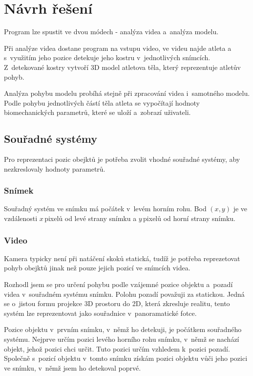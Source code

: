 \chapter{Návrh řešení}

Program lze spustit ve dvou módech - analýza videa a~analýza modelu.

Při analýze videa dostane program na vstupu video, ve videu najde atleta a s~využitím jeho pozice detekuje jeho kostru v~jednotlivých snímcích. Z~detekované kostry vytvoří 3D model atletova těla, který reprezentuje atletův pohyb.

Analýza pohybu modelu probíhá stejně při zpracování videa i~samotného modelu. Podle pohybu jednotlivých částí těla atleta se vypočítají hodnoty biomechanických parametrů, které se uloží a~zobrazí uživateli.




\section{Souřadné systémy}
\label{sec:ssystemy}

Pro reprezentaci pozic obejktů je potřeba zvolit vhodné souřadné systémy, aby nezkreslovaly hodnoty parametrů.



\subsection{Snímek}

Souřadný systém ve snímku má počátek v~levém horním rohu. Bod $(x,y)$ je ve vzdálenosti $x$\,\rm pixelů od levé strany snímku a $y$\,\rm pixelů od horní strany snímku.



\subsection{Video}

Kamera typicky není při natáčení skoků statická, tudíž je potřeba reprezetovat pohyb obejktů jinak než pouze jejich pozicí ve snímcích videa.

Rozhodl jsem se pro určení pohybu podle vzájemné pozice objektu a~pozadí videa v~souřadném systému snímku. Polohu pozadí považuji za statickou. Jedná se o~jistou formu projekce 3D prostoru do 2D, která zkresluje realitu, tento systém lze reprezentovat jako souřadnice v~panoramatické fotce.

Pozice objektu v~prvním snímku, v~němž ho detekuji, je počátkem souřadného systému. Nejprve určím pozici levého horního rohu snímku, v~němž se nachází objekt, jehož pozici chci určit. Tuto pozici určím vzhledem k~pozici pozadí. Společně s~pozicí objektu v~tomto snímku získám pozici objektu vůči jeho pozici ve snímku, v~němž jsem ho detekoval poprvé.

